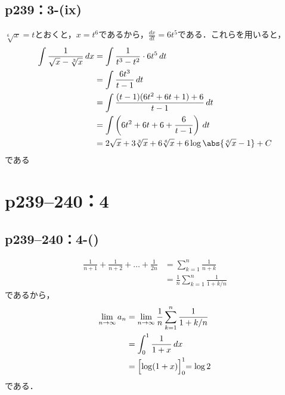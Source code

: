 \subsection*{p239：3-(ix)}

\begin{tanswer}
    $\sqrt[6]{x}=t$とおくと，$x=t^6$であるから，$\frac{dx}{dt}=6t^5$である．これらを用いると，
    \begin{align*}
        \int \frac{1}{\sqrt{x}-\sqrt[3]{x}} \, dx & = \int \frac{1}{t^3-t^2} \cdot 6t^5 \, dt                                 \\
                                                  & = \int \frac{6t^3}{t-1} \, dt                                             \\
                                                  & = \int \frac{(t-1)(6t^2+6t+1)+6}{t-1} \, dt                               \\
                                                  & = \int \left (6t^2+6t+6 + \frac{6}{t-1}\right) \, dt                      \\
                                                  & = 2\sqrt{x}+3 \sqrt[3]{x} + 6 \sqrt[6]{x} + 6 \log \abs{\sqrt[6]{x}-1}+ C
    \end{align*}
    である
\end{tanswer}


\section*{p239--240：4}


\subsection*{p239--240：4-()}

\begin{tanswer}
    \begin{align*}
        \frac{1}{n+1}+ \frac{1}{n+2}+\dots + \frac{1}{2n} & = \sum_{k=1}^{n} \frac{1}{n+k}               \\
                                                          & = \frac{1}{n} \sum_{k=1}^{n} \frac{1}{1+k/n}
    \end{align*}
    であるから，
    \begin{align*}
        \lim_{n \to \infty} a_n & = \lim_{n \to \infty} \frac{1}{n} \sum_{k=1}^{n} \frac{1}{1+k/n} \\
                                & = \int_{0}^{1} \frac{1}{1+x} \, dx                               \\
                                & = \Bigl [ \log (1+x) \Bigl]_{0}^{1} = \log 2
    \end{align*}
    である．
\end{tanswer}



